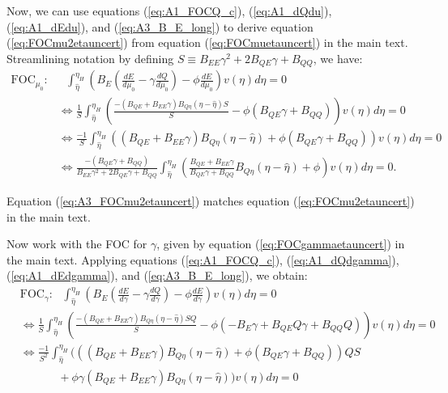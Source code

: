\documentclass[12pt]{article}
\begin{document}
Now, we can use equations (\ref{eq:A1_FOCQ_c}), (\ref{eq:A1_dQdu}), (\ref{eq:A1_dEdu}), and (\ref{eq:A3_B_E_long}) to derive equation (\ref{eq:FOCmu2etauncert}) from equation (\ref{eq:FOCmuetauncert}) in the main text. Streamlining notation by defining $S\equiv B_{EE}\gamma^2+2B_{QE}\gamma+B_{QQ}$, we have:
\begin{align}
\text{FOC}_{\mu_0}:& \text{ } \int_{\hat{\eta}}^{\eta_H}\left(B_E(\frac{dE}{d\mu_0}-\gamma\frac{dQ}{d\mu_0}) -\phi\frac{dE}{d\mu_0}\right)v(\eta)d\eta = 0 \\
&\Leftrightarrow \frac{1}{S}\int_{\hat{\eta}}^{\eta_H}\left(\frac{-(B_{QE}+B_{EE}\gamma)B_{Q\eta}(\eta-\hat{\eta})S}{S} - \phi(B_{QE}\gamma+B_{QQ})\right)v(\eta)d\eta = 0 \\
&\Leftrightarrow \frac{-1}{S}\int_{\hat{\eta}}^{\eta_H}\left((B_{QE}+B_{EE}\gamma)B_{Q\eta}(\eta-\hat{\eta}) + \phi(B_{QE}\gamma+B_{QQ})\right)v(\eta)d\eta = 0 \label{eq:A3_FOCmu2etauncert_int} \\
&\Leftrightarrow \frac{-(B_{QE}\gamma+B_{QQ})}{B_{EE}\gamma^2+2B_{QE}\gamma+B_{QQ}} \int_{\hat{\eta}}^{\eta_H}\left(\frac{B_{QE}+B_{EE}\gamma}{B_{QE}\gamma+B_{QQ}} B_{Q\eta}(\eta-\hat{\eta})+\phi\right)v(\eta)d\eta = 0. \label{eq:A3_FOCmu2etauncert}
\end{align}

Equation (\ref{eq:A3_FOCmu2etauncert}) matches equation (\ref{eq:FOCmu2etauncert}) in the main text.

Now work with the FOC for $\gamma$, given by equation (\ref{eq:FOCgammaetauncert}) in the main text. Applying equations (\ref{eq:A1_FOCQ_c}), (\ref{eq:A1_dQdgamma}), (\ref{eq:A1_dEdgamma}), and (\ref{eq:A3_B_E_long}), we obtain:
\begin{align}
&\text{FOC}_{\gamma}: \text{ } \int_{\hat{\eta}}^{\eta_H}\left(B_E(\frac{dE}{d\gamma}-\gamma\frac{dQ}{d\gamma}) -\phi\frac{dE}{d\gamma}\right)v(\eta)d\eta = 0 \\
&\Leftrightarrow \frac{1}{S}\int_{\hat{\eta}}^{\eta_H}\left(\frac{-(B_{QE}+B_{EE}\gamma)B_{Q\eta}(\eta-\hat{\eta})SQ}{S} - \phi(-B_E\gamma+B_{QE}Q\gamma+B_{QQ}Q)\right)v(\eta)d\eta = 0 \nonumber \\
&\Leftrightarrow \frac{-1}{S^2}\int_{\hat{\eta}}^{\eta_H}(((B_{QE}+B_{EE}\gamma)B_{Q\eta}(\eta-\hat{\eta}) + \phi(B_{QE}\gamma+B_{QQ}))QS \nonumber \\
& \hspace{40pt} + \phi\gamma(B_{QE}+B_{EE}\gamma)B_{Q\eta}(\eta-\hat{\eta}))v(\eta)d\eta = 0 \label{eq:A3_FOCgamma2}
\end{align}
\end{document}
